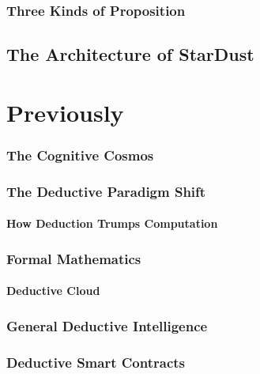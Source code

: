 \documentclass[10pt,titlepage]{book}
\begin{document}
\subsection{Three Kinds of Proposition}\label{three-kinds-of-proposition}

\section{The Architecture of StarDust}\label{the-architecture-of-stardust}


\chapter{Previously}\label{previously}
\subsection{The Cognitive Cosmos}\label{the-cognitive-cosmos}

\subsection{The Deductive Paradigm Shift}\label{the-deductive-paradigm-shift}

\subsubsection{How Deduction Trumps Computation}\label{how-deduction-trumps-computation}

\subsection{Formal Mathematics}\label{formal-mathematics}

\subsubsection{Deductive Cloud}\label{deductive-cloud}

\subsection{General Deductive Intelligence}\label{general-deductive-intelligence}

\subsection{Deductive Smart Contracts}\label{deductive-smart-contracts}

\end{document}
